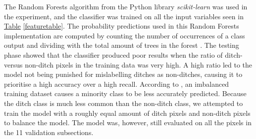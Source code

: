 \documentclass[]{interact}
\theoremstyle{plain}%
\theoremstyle{definition}
\theoremstyle{remark}
\begin{document}
The Random Forests algorithm from the Python library \textit{scikit-learn} was used in the experiment, and the classifier was trained on all the input variables seen in \hyperref[featuretable]{Table} \ref{featuretable}. The probability predictions used in this Random Forests implementation are computed by counting the number of occurrences of a class output and dividing with the total amount of trees in the forest \citep{scikit-learn}. The testing phase showed that the classifier produced poor results when the ratio of ditch- versus non-ditch pixels in the training data was very high. A high ratio led to the model not being punished for mislabelling ditches as non-ditches, causing it to prioritise a high accuracy over a high recall. According to \citet{balanced}, an imbalanced training dataset causes a minority class to be less accurately predicted. Because the ditch class is much less common than the non-ditch class, we attempted to train the model with a roughly equal amount of ditch pixels and non-ditch pixels to balance the model. The model was, however, still evaluated on all the pixels in the 11 validation subsections.
\end{document}
